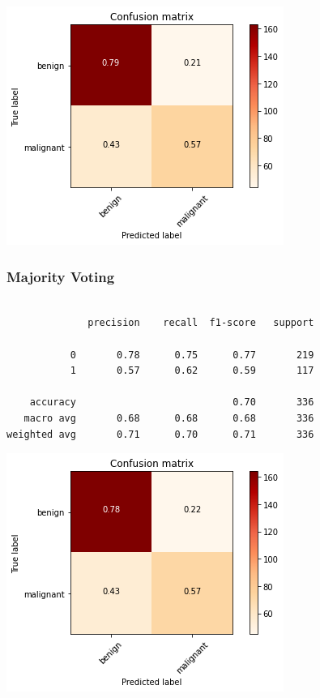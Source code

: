 \documentclass{article}
\begin{document}
\begin{center}
\begin{minipage}{0.45\textwidth}
        \includegraphics[scale=0.6]{./img/cmEnsAvg3_2.png}
    \end{minipage}
\end{center}

\subsubsection{Majority Voting}
\begin{verbatim}

              precision    recall  f1-score   support

           0       0.78      0.75      0.77       219
           1       0.57      0.62      0.59       117

    accuracy                           0.70       336
   macro avg       0.68      0.68      0.68       336
weighted avg       0.71      0.70      0.71       336

\end{verbatim}

\begin{center}
\begin{minipage}{0.45\textwidth}
        \includegraphics[scale=0.6]{./img/cmEnsMaj3_2.png}
    \end{minipage}
\end{center}
\end{document}

